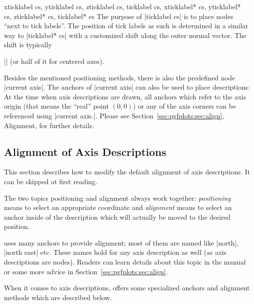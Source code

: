 \begin{coordinatesystemlist}{%
    xticklabel cs,
    yticklabel cs,
    zticklabel cs,
    ticklabel cs,
    xticklabel* cs,
    yticklabel* cs,
    zticklabel* cs,
    ticklabel* cs%
}
    The purpose of |ticklabel cs| is to place nodes ``next to tick labels''.
    The position of tick labels as such is determined in a similar way to
    |ticklabel* cs| with a customized shift along the outer normal vector. The
    shift is typically

    || (or half of it for centered
    axes).
\end{coordinatesystemlist}

Besides the mentioned positioning methods, there is also the predefined node
|current axis|. The anchors of |current axis| can also be used to place
descriptions: At the time when axis descriptions are drawn, all anchors which
refer to the axis origin (that means the ``real'' point $(0,0)$) or any of the
axis corners can be referenced using |current axis.|. Please
see Section~\ref{sec:pgfplots:sec:align}, Alignment, for further details.


\subsection{Alignment of Axis Descriptions}

This section describes how to modify the default alignment of axis
descriptions. It can be skipped at first reading.

The two topics positioning and alignment always work together:
\emph{positioning} means to select an appropriate coordinate and
\emph{alignment} means to select an anchor inside of the description which will
actually be moved to the desired position.

\Tikz{} uses many anchors to provide alignment; most of them are named like
|north|, |north east| etc. These names hold for any axis description as well
(as axis descriptions are \Tikz{} nodes). Readers can learn details about this
topic in the \Tikz{} manual~\cite{tikz} or some more advice in
Section~\ref{sec:pgfplots:sec:align}.

When it comes to axis descriptions, \PGFPlots{} offers some specialized anchors
and alignment methods which are described below.

